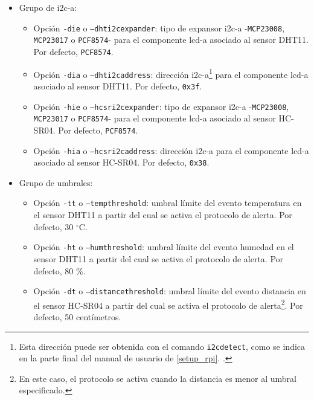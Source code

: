 \documentclass[12pt,a4paper, twoside]{report}
\begin{document}
\begin{itemize}
		\item Grupo de \gls{i2c-a}:
		\begin{itemize}
			\item Opción \texttt{-die} o \texttt{--dhti2cexpander}: tipo de expansor \gls{i2c-a} -\texttt{MCP23008}, \texttt{MCP23017} o \texttt{PCF8574}- para el componente \gls{lcd-a} asociado al \gls{sensor} DHT11. Por defecto, \texttt{PCF8574}.
			
			\item Opción \texttt{-dia} o \texttt{--dhti2caddress}: dirección \gls{i2c-a}\footnote{Esta dirección puede ser obtenida con el comando \texttt{i2cdetect}, como se indica en la parte final del manual de usuario de \ref{setup_rpi}. .} para el componente \gls{lcd-a} asociado al \gls{sensor} DHT11. Por defecto, \texttt{0x3f}.
			
			\item Opción \texttt{-hie} o \texttt{--hcsri2cexpander}: tipo de expansor \gls{i2c-a} -\texttt{MCP23008}, \texttt{MCP23017} o \texttt{PCF8574}- para el componente \gls{lcd-a} asociado al \gls{sensor} HC-SR04. Por defecto, \texttt{PCF8574}.
			
			\item Opción \texttt{-hia} o \texttt{--hcsri2caddress}: dirección \gls{i2c-a} para el componente \gls{lcd-a} asociado al \gls{sensor} HC-SR04. Por defecto, \texttt{0x38}.
		\end{itemize}
		
		\item Grupo de umbrales:
		\begin{itemize}
			\item Opción \texttt{-tt} o \texttt{--tempthreshold}: umbral límite del evento temperatura en el \gls{sensor} DHT11 a partir del cual se activa el protocolo de alerta. Por defecto, 30 $^{\circ}$C.
			\item Opción \texttt{-ht} o \texttt{--humthreshold}: umbral límite del evento humedad en el \gls{sensor} DHT11 a partir del cual se activa el protocolo de alerta. Por defecto, 80 \%.
			\item Opción \texttt{-dt} o \texttt{--distancethreshold}: umbral límite del evento distancia en el \gls{sensor} HC-SR04 a partir del cual se activa el protocolo de alerta\footnote{En este caso, el protocolo se activa cuando la distancia es menor al umbral especificado.}. Por defecto, 50 centímetros.
		\end{itemize}
	\end{itemize}
	
\end{document}
